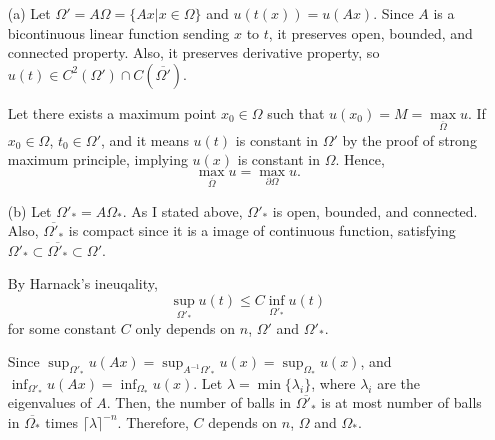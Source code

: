 \documentclass{article}
\begin{document}
\begin{enumerate}
\item[(a)] Let $\Omega'=A\Omega=\{Ax|x\in \Omega\}$ and $u(t(x))=u(Ax)$. Since $A$ is a bicontinuous linear function sending $x$ to $t$, it preserves open, bounded, and connected property. Also, it preserves derivative property, so $u(t)\in C^2(\Omega')\cap C(\overline{\Omega'})$.

Let there exists a maximum point $x_0\in \Omega$ such that $u(x_0)=M=\max\limits_{\overline{\Omega}}u$. If $x_0\in \Omega$, $t_0 \in \Omega'$, and it means $u(t)$ is constant in $\Omega'$ by the proof of strong maximum principle, implying $u(x)$ is constant in $\Omega$. Hence,
\begin{equation*}
\max_{\overline{\Omega}}u=\max_{\partial \Omega}u.
\end{equation*}
\item[(b)] Let $\Omega'_*=A\Omega_*$. As I stated above, $\Omega'_*$ is open, bounded, and connected. Also, $\overline{\Omega'_*}$ is compact since it is a image of continuous function, satisfying $\Omega'_*\subset\overline{\Omega'_*}\subset \Omega'$.

By Harnack's ineuqality, 
\begin{equation*}
\sup_{\Omega'_*}u(t)\leq C\inf_{\Omega'_*}u(t)
\end{equation*}
for some constant $C$ only depends on $n$, $\Omega'$ and $\Omega'_*$.

Since $\sup_{\Omega'_*}u(Ax)=\sup_{A^{-1}\Omega'_*}u(x)=\sup_{\Omega_*}u(x)$, and $\inf_{\Omega'_*}u(Ax)=\inf_{\Omega_*}u(x)$. Let $\lambda=\min\{\lambda_i\}$, where $\lambda_i$ are the eigenvalues of $A$. Then, the number of balls in $\overline{\Omega'_*}$ is at most number of balls in $\overline{\Omega_*}$ times $\lceil\lambda\rceil^{-n}$. Therefore, $C$ depends on $n$, $\Omega$ and $\Omega_*$.
\end{enumerate}
\end{document}

